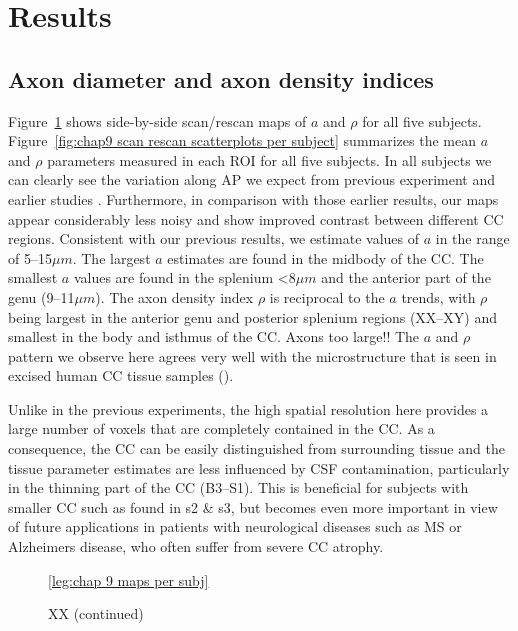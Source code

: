 \section{Results}
\subsection*{Axon diameter and axon density indices}
Figure~\ref{fig:chap9 scan rescan maps per subject} shows side-by-side scan/rescan maps of $a$ and $\rho$ for all five subjects. Figure~\ref{fig:chap9 scan rescan scatterplots per subject} summarizes the mean $a$ and $\rho$ parameters measured in each ROI for all five subjects. In all subjects we can clearly see the variation along AP we expect from previous experiment and earlier studies \citep{Alexander:2010}. Furthermore, in comparison with those earlier results, our maps appear considerably less noisy and show improved contrast between different CC regions. Consistent with our previous results, we estimate values of $a$ in the range of 5--15$\mu m$. The largest $a$ estimates are found in the midbody of the CC. The smallest $a$ values are found in the splenium <8$\mu m$ and the anterior part of the genu (9--11$\mu m$). The axon density index $\rho$ is reciprocal to the $a$ trends, with $\rho$ being largest in the anterior genu and posterior splenium regions  (XX--XY) and smallest in the body and isthmus of the CC. Axons too large!! The $a$ and $\rho$ pattern we observe here agrees very well with the microstructure that is seen in excised human CC tissue samples ().


Unlike in the previous experiments, the high spatial resolution here provides a large number of voxels that are completely contained in the CC. As a consequence, the CC can be easily distinguished from surrounding tissue and the tissue parameter estimates are less influenced by CSF contamination, particularly in the thinning part of the CC (B3--S1). This is beneficial for subjects with smaller CC such as found in s2 \& s3, but becomes even more important in view of future applications in patients with neurological diseases such as MS or Alzheimers disease, who often suffer from severe CC atrophy. 
\begin{figure}[ht]
	\centering
 	\ref{leg:chap 9 maps per subj}
	\caption{XX (continued)}
	\label{fig:chap9 scan rescan maps per subject}
\end{figure}

